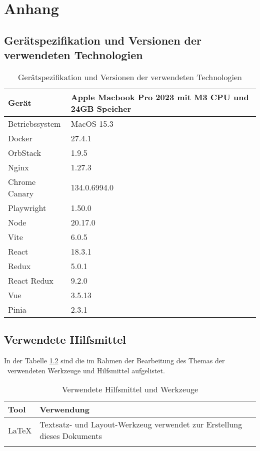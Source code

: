 %

\chapter{Anhang}

\section{Gerätspezifikation und Versionen der verwendeten Technologien}

\begin{table}[h!]
  \caption{Gerätspezifikation und Versionen der verwendeten Technologien}
  \label{tab:specsAndVersions}
  
  \begin{center}
    \begin{tabular}{ | m{5cm}| m{5cm} | } 
      \hline
      Gerät & Apple Macbook Pro 2023 mit M3 CPU und 24GB Speicher \\ 
      \hline
      Betriebssystem & MacOS 15.3 \\ 
      \hline
      Docker & 27.4.1 \\ 
      \hline
      OrbStack & 1.9.5 \\ 
      \hline
      Nginx & 1.27.3 \\ 
      \hline
      Chrome Canary & 134.0.6994.0 \\ 
      \hline
      Playwright & 1.50.0 \\ 
      \hline
      Node & 20.17.0 \\ 
      \hline
      Vite & 6.0.5 \\ 
      \hline
      React & 18.3.1 \\ 
      \hline
      Redux & 5.0.1 \\ 
      \hline
      React Redux & 9.2.0 \\ 
      \hline
      Vue & 3.5.13 \\ 
      \hline
      Pinia & 2.3.1 \\ 
      \hline
    \end{tabular}
  \end{center}
\end{table}

\section{Verwendete Hilfsmittel}
In der Tabelle \ref{tab:tooling} sind die im Rahmen der Bearbeitung des Themas der \IthesisKindDE~verwendeten Werkzeuge und Hilfsmittel aufgelistet.

\begin{table}[h!]
\caption{Verwendete Hilfsmittel und Werkzeuge}
\begin{tabular}{|l|l|}
\hline 
\rowcolor{lightgray} Tool & Verwendung \\
\hline
\LaTeX & Textsatz- und Layout-Werkzeug verwendet zur Erstellung dieses Dokuments \\
\hline
 & \\
\hline
\end{tabular}
\label{tab:tooling}
\end{table}

